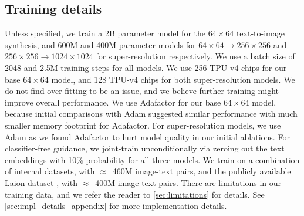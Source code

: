 \subsection{Training details}
\vspace{-0.15cm}
\label{sec:experiments_trainingdetails}
Unless specified, we train a 2B parameter model for the $64\times64$ text-to-image synthesis, and 600M and 400M parameter models for $64\times64 \rightarrow 256\times256$ and $256\times256 \rightarrow 1024\times1024$ for super-resolution respectively. We use a batch size of 2048 and 2.5M training steps for all models. We use 256 TPU-v4 chips for our base $64\times64$ model, and 128 TPU-v4 chips for both super-resolution models. We do not find over-fitting to be an issue, and we believe further training might improve overall performance. We use Adafactor for our base $64\times64$ model, because initial comparisons with Adam suggested similar performance with much smaller memory footprint for Adafactor. For super-resolution models, we use Adam as we found Adafactor to hurt model quality in our initial ablations. For classifier-free guidance, we joint-train unconditionally via zeroing out the text embeddings with 10\% probability for all three models. We train on a combination of internal datasets, with $\approx$~460M image-text pairs, and the publicly available Laion dataset \cite{schuhmann2021laion}, with $\approx$~400M image-text pairs. There are limitations in our training data, and we refer the reader to \cref{sec:limitations} for details. See \cref{sec:impl_details_appendix} for more implementation details.
